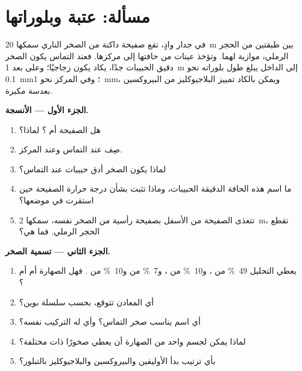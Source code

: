 \section{مسألة: عتبة وبلوراتها}

\begin{problem}
\label{pb:g11:igneous-rocks:1}
في جدار وادٍ، تقع صفيحة داكنة من الصخر الناري سمكها \qty{20}{m}
بين طبقتين من الحجر الرملي، موازية لهما. وتؤخذ عينات من
حافتها إلى مركزها. فعند التماس يكون الصخر دقيق الحبيبات جدًا، يكاد يكون
زجاجيًا؛ وعلى بعد \qty{1}{m} إلى الداخل يبلغ طول بلوراته نحو \qty{0.1}{mm}؛ وفي
المركز نحو \qty{1}{mm}، ويمكن بالكاد تمييز البلاجيوكليز من البيروكسين
بعدسة مكبرة.

\medskip
\noindent\textbf{الجزء الأول --- الأنسجة.}
\begin{enumerate}
  \item هل الصفيحة  أم ؟ لماذا؟
  \item صِف  عند التماس وعند المركز.
  \item لماذا يكون الصخر أدق حبيبات عند التماس؟
  \item ما اسم هذه الحافة الدقيقة الحبيبات، وماذا تثبت بشأن
        درجة حرارة الصفيحة حين استقرت في موضعها؟
  \item تتغذى الصفيحة من الأسفل بصفيحة رأسية من الصخر نفسه،
        سمكها \qty{2}{m}، تقطع الحجر الرملي. فما هي؟
\end{enumerate}

\medskip
\noindent\textbf{الجزء الثاني --- تسمية الصخر.}
\begin{enumerate}[resume]
  \item يعطي التحليل \qty{49}{\percent} من ، و\qty{10}{\percent} من
        ، و\qty{7}{\percent} من  و\qty{10}{\percent} من
        . فهل الصهارة  أم  أم ؟
  \item أي المعادن تتوقع، بحسب سلسلة بوين؟
  \item أي اسم يناسب صخر التماس؟ وأي  له
        التركيب نفسه؟
  \item لماذا يمكن لجسم واحد من الصهارة أن يعطي صخورًا ذات  مختلفة؟
  \item بأي ترتيب بدأ الأوليفين والبيروكسين والبلاجيوكليز
        بالتبلور؟
\end{enumerate}


\end{problem}
